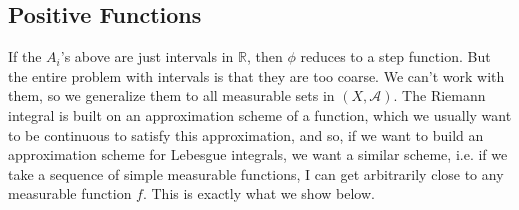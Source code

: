 \subsection{Positive Functions}

  If the $A_i$'s above are just intervals in $\mathbb{R}$, then $\phi$ reduces to a step function. But the entire problem with intervals is that they are too coarse. We can't work with them, so we generalize them to all measurable sets in $(X, \mathcal{A})$. The Riemann integral is built on an approximation scheme of a function, which we usually want to be continuous to satisfy this approximation, and so, if we want to build an approximation scheme for Lebesgue integrals, we want a similar scheme, i.e. if we take a sequence of simple measurable functions, I can get arbitrarily close to any measurable function $f$. This is exactly what we show below. 

